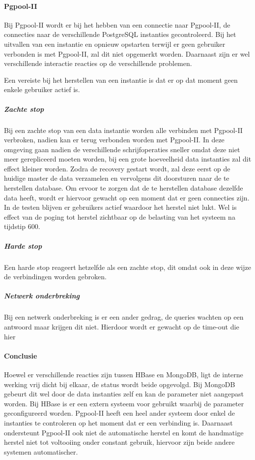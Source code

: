 \paragraph{Pgpool-II} Bij Pgpool-II wordt er bij het hebben van een connectie naar Pgpool-II, de connecties naar de verschillende PostgreSQL instanties gecontroleerd. Bij het uitvallen van een instantie en opnieuw opstarten terwijl er geen gebruiker verbonden is met Pgpool-II, zal dit niet opgemerkt worden. Daarnaast zijn er wel verschillende interactie reacties op de verschillende problemen. 

Een vereiste bij het herstellen van een instantie is dat er op dat moment geen enkele gebruiker actief is. 

\subparagraph{Zachte stop} Bij een zachte stop van een data instantie worden alle verbinden met Pgpool-II verbroken, nadien kan er terug verbonden worden met Pgpool-II. In deze omgeving gaan nadien de verschillende schrijfoperaties sneller omdat deze niet meer gerepliceerd moeten worden, bij een grote hoeveelheid data instanties zal dit effect kleiner worden. Zodra de recovery gestart wordt, zal deze eerst op de huidige master de data verzamelen en vervolgens dit doorsturen naar de te herstellen database. Om ervoor te zorgen dat de te herstellen database dezelfde data heeft, wordt er hiervoor gewacht op een moment dat er geen connecties zijn. In de testen blijven er gebruikers actief waardoor het herstel niet lukt. Wel is effect van de poging tot herstel zichtbaar op de belasting van het systeem na tijdstip 600. 

\subparagraph{Harde stop} Een harde stop reageert hetzelfde als een zachte stop, dit omdat ook in deze wijze de verbindingen worden gebroken. 

\subparagraph{Netwerk onderbreking} Bij een netwerk onderbreking is er een ander gedrag, de queries wachten op een antwoord maar krijgen dit niet. Hierdoor wordt er gewacht op de time-out die hier \todo{}

\paragraph{Conclusie} Hoewel er verschillende reacties zijn tussen HBase en MongoDB, ligt de interne werking vrij dicht bij elkaar, de status wordt beide opgevolgd. Bij MongoDB gebeurt dit wel door de data instanties zelf en kan de parameter niet aangepast worden. Bij HBase is er een extern systeem voor gebruikt waarbij de parameter geconfigureerd worden. Pgpool-II heeft een heel ander systeem door enkel de instanties te controleren op het moment dat er een verbinding is. 
Daarnaast ondersteunt Pgpool-II ook niet de automatische herstel en komt de handmatige herstel niet tot voltooiing onder constant gebruik, hiervoor zijn beide andere systemen automatischer. 

